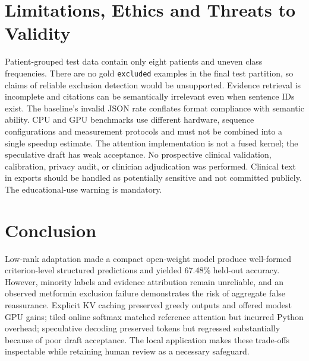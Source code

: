 \documentclass[conference]{IEEEtran}
\begin{document}
\section{Limitations, Ethics and Threats to Validity}
Patient-grouped test data contain only eight patients and uneven class frequencies. There are no gold \texttt{excluded} examples in the final test partition, so claims of reliable exclusion detection would be unsupported. Evidence retrieval is incomplete and citations can be semantically irrelevant even when sentence IDs exist. The baseline's invalid JSON rate conflates format compliance with semantic ability. CPU and GPU benchmarks use different hardware, sequence configurations and measurement protocols and must not be combined into a single speedup estimate. The attention implementation is not a fused kernel; the speculative draft has weak acceptance. No prospective clinical validation, calibration, privacy audit, or clinician adjudication was performed. Clinical text in exports should be handled as potentially sensitive and not committed publicly. The educational-use warning is mandatory.
\section{Conclusion}
Low-rank adaptation made a compact open-weight model produce well-formed criterion-level structured predictions and yielded 67.48\% held-out accuracy. However, minority labels and evidence attribution remain unreliable, and an observed metformin exclusion failure demonstrates the risk of aggregate false reassurance. Explicit KV caching preserved greedy outputs and offered modest GPU gains; tiled online softmax matched reference attention but incurred Python overhead; speculative decoding preserved tokens but regressed substantially because of poor draft acceptance. The local application makes these trade-offs inspectable while retaining human review as a necessary safeguard.
\end{document}
